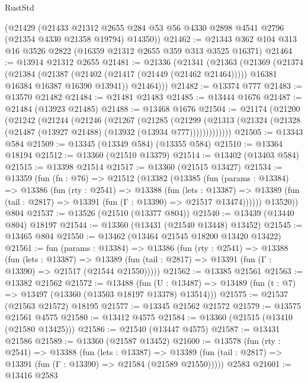 \begin{lexlean}{RustStd}
\begin{coremodule}
    (@21429
      (@21433
        @21312
        @2655
        @284
        @53
        @56
        @4330
        @2898
        @4541
        @2796
        (@21354 @4330 @21358 @19794)
        @14350))
@21462 := @21343 @362 @104 @313 @16 @3526 @2822 (@16359 @21312 @2655 @359 @313 @3525 @16371)
@21464 := @13914 @21312 @2655
@21481 := @21336
    (@21341
      (@21363
        (@21369
          (@21374
            (@21384
              (@21387 (@21402 (@21417 (@21449 (@21462 @21464)))))
              @16381
              @16384
              @16387
              @16390
              @13941))
          @21464)))
@21482 := @13374 @777
@21483 := @13570 @21482
@21484 := @21481 @21483
@21485 := @13444 @1676
@21487 := @21484 (@13923 @21485)
@21488 := @13468 @1676
@21504 := @21174
    (@21200
      (@21242
        (@21244
          (@21246
            (@21267
              (@21285
                (@21299
                  (@21313 (@21324 (@21328 (@21487 (@13927 @21488) (@13932 (@13934 @777)))))))))))))
@21505 := @13343 @584
@21509 := @13345 (@13349 @584) (@13355 @584)
@21510 := @13364 @18194
@21512 := @13360 (@21510 @13379)
@21514 := @13402 (@13403 @584)
@21515 := @13398 @21514
@21517 := @13360 (@21515 @13427)
@21534 := @13359
    (fun (fn : @76) =>
    @21512
      (@13382
        (@13385
          (fun (params : @13384) =>
          @13386
            (fun (rty : @2541) =>
            @13388
              (fun (lets : @13387) =>
              @13389 (fun (tail : @2817) => @13391 (fun (Γ : @13390) => @21517 @13474))))))
        @13520))
    @804
@21537 := @13526 (@21510 (@13377 @804))
@21540 := @13439 (@13440 @804) @18197
@21544 := @13360 (@13431 (@21540 @13448) @13452)
@21545 := @13465 @804
@21550 := @13462 (@13464 @21545 @18200 @13420 @13422)
@21561 := fun (params : @13384) =>
  @13386
    (fun (rty : @2541) =>
    @13388
      (fun (lets : @13387) =>
      @13389 (fun (tail : @2817) => @13391 (fun (Γ : @13390) => @21517 (@21544 @21550)))))
@21562 := @13385 @21561
@21563 := @13382 @21562
@21572 := @13488
    (fun (U : @13487) => @13489 (fun (t : @7) => @13497 (@13360 (@13503 @18197 @13378) @13514)))
@21575 := @21537 (@21563 @21572) @18195
@21577 := @13345 @21562 @21572
@21579 := @13575 @21561 @4575
@21580 := @13412 @4575
@21584 := @13360 (@21515 (@13410 (@21580 @13425)))
@21586 := @21540 (@13447 @4575)
@21587 := @13431 @21586
@21589 := @13360 (@21587 @13452)
@21600 := @13578
    (fun (rty : @2541) =>
    @13388
      (fun (lets : @13387) =>
      @13389 (fun (tail : @2817) => @13391 (fun (Γ : @13390) => @21584 (@21589 @21550)))))
    @2583
@21601 := @13416 @2583

\end{coremodule}
\end{lexlean}
